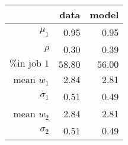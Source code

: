 \begin{table}[!h]
\centering
 \caption{} \;\begin{tabular}{rrr}
\toprule
 & \textbf{data} & \textbf{model}\\
\midrule
$\mu_1$ & 0.95 & 0.95\\
$\rho$ & 0.30 & 0.39\\
$\textrm{\% in job 1}$ & $58.80$ & $56.00$\\
mean $w_1$ & 2.84 & 2.81\\
$\sigma_1$ & 0.51 & 0.49\\
mean $w_2$ & 2.84 & 2.81\\
$\sigma_2$ & 0.51 & 0.49\\
\bottomrule
\end{tabular}
\end{table}